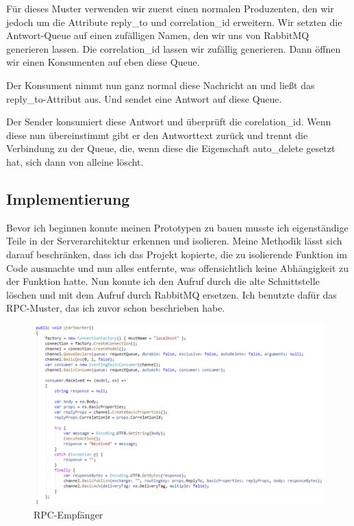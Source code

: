 \documentclass[12pt,a4paper]{scrartcl}
\begin{document}
Für dieses Muster verwenden wir zuerst einen normalen Produzenten, den wir jedoch um die Attribute reply\_to und correlation\_id erweitern. Wir setzten die Antwort-Queue auf einen zufälligen Namen, den wir uns von RabbitMQ generieren lassen. 
Die correlation\_id lassen wir zufällig generieren. Dann öffnen wir einen Konsumenten auf eben diese Queue.

Der Konsument nimmt nun ganz normal diese Nachricht an und ließt das reply\_to-Attribut aus. Und sendet eine Antwort auf diese Queue.

Der Sender konsumiert diese Antwort und überprüft die corelation\_id. Wenn diese nun übereinstimmt gibt er den Antworttext zurück und trennt die Verbindung zu der Queue, die, wenn diese die Eigenschaft auto\_delete gesetzt hat, sich dann von alleine löscht.

\subsection{Implementierung}

Bevor ich beginnen konnte meinen Prototypen zu bauen musste ich eigenständige Teile in der Serverarchitektur erkennen und isolieren. 
Meine Methodik lässt sich darauf beschränken, dass ich das Projekt kopierte, die zu isolierende Funktion im Code ausmachte und nun alles entfernte, was offensichtlich keine Abhängigkeit zu der Funktion hatte. 
Nun konnte ich den Aufruf durch die alte Schnittstelle löschen und mit dem Aufruf durch RabbitMQ ersetzen. Ich benutzte dafür das RPC-Muster, das ich zuvor schon beschrieben habe. 

\begin{figure}[h!]
	\centering
	\includegraphics[scale=0.6]{RPCWorkerWhite.png}
	\caption[Screenshot]{RPC-Empfänger}
\end{figure}
\end{document}
